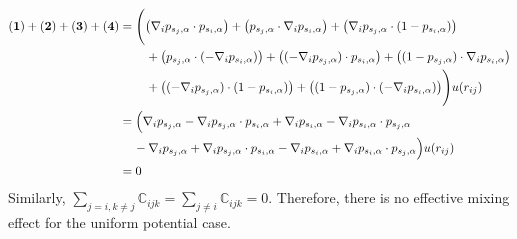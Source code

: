 \documentclass[11pt, oneside]{article}   	%
\begin{document}
\begin{align} \notag
\mathbf{(1)}+\mathbf{(2)}+\mathbf{(3)}+\mathbf{(4)} &= \Biggl( \bigl(\nabla_i p_{s_j,\alpha} \cdot p_{s_i,\alpha}\bigr) + \bigl(p_{s_j,\alpha} \cdot \nabla_i p_{s_i,\alpha}\bigr) + \bigl(\nabla_i p_{s_j,\alpha} \cdot (1-p_{s_i,\alpha})\bigr)  \\ \notag
& \quad \quad \,+ \bigl(p_{s_j,\alpha} \cdot (-\nabla_i p_{s_i,\alpha})\bigr) + \bigl((-\nabla_i p_{s_j,\alpha}) \cdot p_{s_i,\alpha}\bigr) + \bigl((1-p_{s_j,\alpha}) \cdot \nabla_i p_{s_i,\alpha}\bigr) \\ \notag
& \quad \quad \, + \bigl((-\nabla_i p_{s_j,\alpha}) \cdot (1-p_{s_i,\alpha})\bigr) + \bigl((1-p_{s_j,\alpha}) \cdot (-\nabla_i p_{s_i,\alpha})\bigr)\Biggr) u(r_{ij})\\ \notag
& = \Bigl(\nabla_i p_{s_j,\alpha} - \nabla_i p_{s_j,\alpha} \cdot p_{s_i,\alpha} +  \nabla_i p_{s_i,\alpha} - \nabla_i p_{s_i,\alpha} \cdot p_{s_j,\alpha} \\ \notag
& \quad \,- \nabla_i p_{s_j,\alpha} + \nabla_i p_{s_j,\alpha} \cdot p_{s_i,\alpha} -  \nabla_i p_{s_i,\alpha} + \nabla_i p_{s_i,\alpha} \cdot p_{s_j,\alpha} \Bigr) u(r_{ij})\\ \notag
& = 0
\end{align}
Similarly, $\sum_{j=i,k\neq j} \mathbb{C}_{ijk} = \sum_{j\neq i} \mathbb{C}_{ijk} = 0 $. Therefore, there is no effective mixing effect for the uniform potential case. \\
\end{document}
